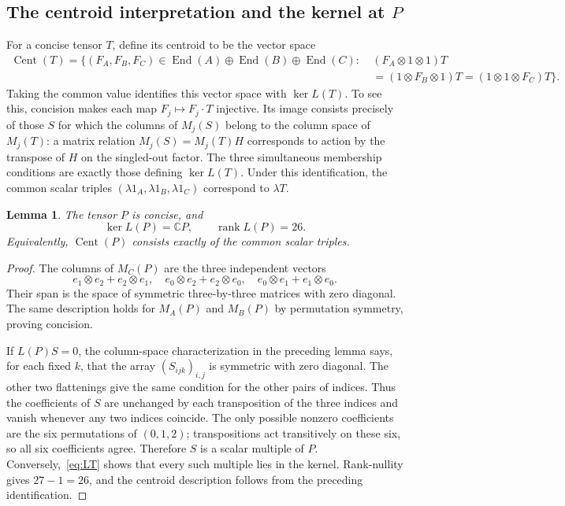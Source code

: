 \documentclass[10pt,a4paper]{article}
\newtheorem{lemma}[theorem]{Lemma}
\theoremstyle{definition}
\theoremstyle{remark}
\numberwithin{equation}{section}
\newcommand{\C}{\mathbb C}
\DeclareMathOperator{\rank}{rank}
\DeclareMathOperator{\End}{End}
\DeclareMathOperator{\Cent}{Cent}
\begin{document}
\subsection{The centroid interpretation and the kernel at \texorpdfstring{$P$}{P}}

For a concise tensor $T$, define its centroid to be the vector space
\begin{equation}\label{eq:centroid}
 \begin{split}
 \Cent(T)=\{(F_A,F_B,F_C)\in\End(A)\oplus\End(B)\oplus\End(C):\ &
 (F_A\otimes1\otimes1)T\\
 &=(1\otimes F_B\otimes1)T
 =(1\otimes1\otimes F_C)T\}.
 \end{split}
\end{equation}
Taking the common value identifies this vector space with
$\ker L(T)$. To see this, concision makes each map
$F_j\mapsto F_j\cdot T$ injective. Its image consists precisely
of those $S$ for which the columns of $M_j(S)$ belong to the
column space of $M_j(T)$: a matrix relation
$M_j(S)=M_j(T)H$ corresponds to action by the transpose of $H$
on the singled-out factor. The three simultaneous membership
conditions are exactly those defining $\ker L(T)$.
Under this identification, the common scalar triples
$(\lambda1_A,\lambda1_B,\lambda1_C)$ correspond to $\lambda T$.

\begin{lemma}\label{lem:scalar}
The tensor $P$ is concise, and
\begin{equation}\label{eq:kernelP}
 \ker L(P)=\C P,\qquad \rank L(P)=26.
\end{equation}
Equivalently, $\Cent(P)$ consists exactly of the common scalar triples.
\end{lemma}

\begin{proof}
The columns of $M_C(P)$ are the three independent vectors
\[
 e_1\otimes e_2+e_2\otimes e_1,\quad
 e_0\otimes e_2+e_2\otimes e_0,\quad
 e_0\otimes e_1+e_1\otimes e_0.
\]
Their span is the space of symmetric three-by-three matrices with
zero diagonal. The same description holds for $M_A(P)$ and
$M_B(P)$ by permutation symmetry, proving concision.

If $L(P)S=0$, the column-space characterization in the preceding
lemma says, for each fixed $k$, that the array $(S_{ijk})_{i,j}$
is symmetric with zero diagonal. The other two flattenings give
the same condition for the other pairs of indices. Thus the
coefficients of $S$ are unchanged by each transposition of the
three indices and vanish whenever any two indices coincide.
The only possible nonzero coefficients are the six permutations
of $(0,1,2)$; transpositions act transitively on these six, so all
six coefficients agree. Therefore $S$ is a scalar multiple of $P$.
Conversely,~\eqref{eq:LT} shows that every such multiple lies in
the kernel. Rank-nullity gives $27-1=26$, and the centroid
description follows from the preceding identification.
\end{proof}
\end{document}
